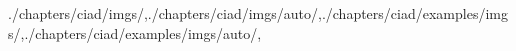 \begin{graphicspathcontext}{{./chapters/ciad/imgs/},{./chapters/ciad/imgs/auto/},{./chapters/ciad/examples/imgs/},{./chapters/ciad/examples/imgs/auto/},\old}







\end{graphicspathcontext}

\endinput
